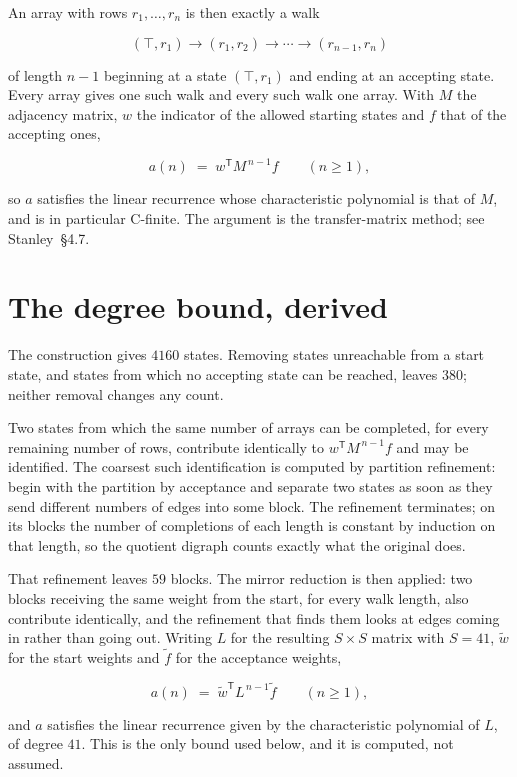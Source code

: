 \documentclass[11pt]{article}
\theoremstyle{definition}
\begin{document}
An array with rows $r_1,\dots,r_n$ is then exactly a walk

\[(\top,r_1) \to (r_1,r_2) \to \cdots \to (r_{n-1},r_n)\]

of length $n-1$ beginning at a state $(\top,r_1)$ and ending at an accepting state. Every array gives one such walk and every such walk one array. With $M$ the adjacency matrix, $w$ the indicator of the allowed starting states and $f$ that of the accepting ones,

\[a(n) \;=\; w^{\mathsf T} M^{\,n-1} f \qquad (n \ge 1),\]

so $a$ satisfies the linear recurrence whose characteristic polynomial is that of $M$, and is in particular C-finite. The argument is the transfer-matrix method; see Stanley~\S4.7.

\section{The degree bound, derived}

The construction gives $4160$ states. Removing states unreachable from a start state, and states from which no accepting state can be reached, leaves $380$; neither removal changes any count.

Two states from which the same number of arrays can be completed, for every remaining number of rows, contribute identically to $w^{\mathsf T}M^{\,n-1}f$ and may be identified. The coarsest such identification is computed by partition refinement: begin with the partition by acceptance and separate two states as soon as they send different numbers of edges into some block. The refinement terminates; on its blocks the number of completions of each length is constant by induction on that length, so the quotient digraph counts exactly what the original does.

That refinement leaves $59$ blocks. The mirror reduction is then applied: two blocks receiving the same weight from the start, for every walk length, also contribute identically, and the refinement that finds them looks at edges coming in rather than going out. Writing $L$ for the resulting $S \times S$ matrix with $S = 41$, $\tilde w$ for the start weights and $\tilde f$ for the acceptance weights,

\[a(n) \;=\; \tilde w^{\mathsf T} L^{\,n-1} \tilde f \qquad (n \ge 1),\]

and $a$ satisfies the linear recurrence given by the characteristic polynomial of $L$, of degree $41$. This is the only bound used below, and it is computed, not assumed.
\end{document}
